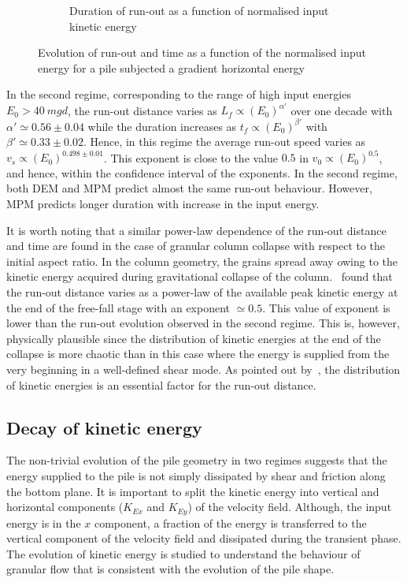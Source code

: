 \begin{figure}[tbph]
\begin{subfigure}[b]{0.975\textwidth}
\caption{Duration of run-out as a function of normalised input kinetic energy}
\label{fig:Tf_vs_Eo_Slope}
\end{subfigure}
\caption{Evolution of run-out and time as a function of the normalised input 
energy for a pile subjected a gradient horizontal energy}
\label{fig:Slope}
\end{figure}

In the second regime, corresponding to the range of high input energies  $E_0 > 
40 \ mgd$, the run-out distance varies as $L_f \propto (E_0)^{\alpha'}$ over 
one decade with $\alpha' \simeq 0.56\pm 0.04$ while the duration increases as 
$t_f \propto (E_0)^{\beta'}$ with $\beta' \simeq 0.33 \pm 0.02$. Hence, in this 
regime the average run-out speed varies as $v_s \propto (E_0)^{0.498 \pm 
0.01}$. This exponent is close to the value $0.5$ in $v_0 \propto (E_0)^{0.5}$, 
and hence, within the confidence interval of the exponents.
In the second regime, both DEM and MPM predict almost the same run-out 
behaviour. However, MPM predicts longer duration with increase in the input 
energy.

It is worth noting that a similar power-law dependence of the run-out distance 
and time are found in the case of granular column collapse with respect to 
the initial aspect ratio. In the column geometry, the grains spread away 
owing to the kinetic energy acquired during gravitational collapse of the 
column.~\citet{Topin2012} found that the run-out distance varies as a power-law 
of the available peak kinetic energy at the end of the free-fall stage with an 
exponent $\simeq 0.5$. This value of exponent is lower than the run-out 
evolution observed in the second regime. This is, however, physically plausible 
since the distribution of kinetic energies at the end of the collapse 
is more chaotic than in this case where the energy is supplied from the very 
beginning in a well-defined shear mode. As pointed out by~\citet{Staron2005}, 
the distribution of kinetic energies is an essential factor for the run-out 
distance.

\subsection{Decay of kinetic energy}
\label{sec:decay}

The non-trivial evolution of the pile geometry in two regimes suggests that 
the energy supplied to the pile is not simply dissipated by shear and friction 
along the bottom plane. It is important to split the kinetic energy into 
vertical and horizontal components ($K_{Ex}$ and $K_{Ey}$) of the velocity 
field. Although, the input energy is in the $x$ component, a fraction of 
the energy is transferred to the vertical component of the velocity field and 
dissipated during the transient phase. The evolution of kinetic energy is 
studied to understand the behaviour of granular flow that is consistent with 
the evolution of the pile shape.


